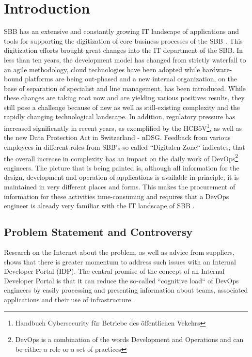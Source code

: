 \documentclass[a4paper,12pt]{article}
\begin{document}
    \section{Introduction}
    \label{sec:introduction}
    SBB has an extensive and constantly growing IT landscape of applications and tools for supporting the digitization
    of core business processes of the SBB .
    This digitization efforts brought great changes into the IT department of the SBB.
    In less than ten years, the development model has changed from strictly waterfall to an agile methodology, cloud
    technologies have been adopted while hardware-bound platforms are being out-phased and a new internal organization,
    on the base of separation of specialist and line management, has been introduced.
    While these changes are taking root now and are yielding various positives results, they still pose a challenge
    because of new as well as still-existing complexity and the rapidly changing technological landscape.
    In addition, regulatory pressure has increased significantly in recent years, as exemplified by the
    HCBöV\footnote{Handbuch Cybersecurity für Betriebe des öffentlichen Vekehrs}, as well as the new Data Protection Act
    in Switzerland - nDSG.\linebreak
    Feedback from various employees in different roles from SBB's so called ``Digitalen Zone`` indicates, that the overall
    increase in complexity has an impact on the daily work of DevOps\footnote{DevOps is a combination of the words
    Development and Operations and can be either a role or a set of practices} engineers.
    The picture that is being painted is, although all information for the design, development and operation of
    applications is available in principle, it is maintained in very different places and forms.
    This makes the procurement of information for these activities time-consuming and requires that a DevOps
    engineer is already very familiar with the IT landscape of SBB .

    \subsection{Problem Statement and Controversy}
    \label{subsec:iproblemstatement}
    Research on the Internet about the problem, as well as advice from suppliers, shows that there is greater momentum
    to address such issues with an Internal Developer Portal (IDP). The central promise of the concept of an
    Internal Developer Portal is that it can reduce the so-called ``cognitive load`` of DevOps engineers by easily
    processing and presenting information about teams, associated applications and their use of infrastructure.
\end{document}
